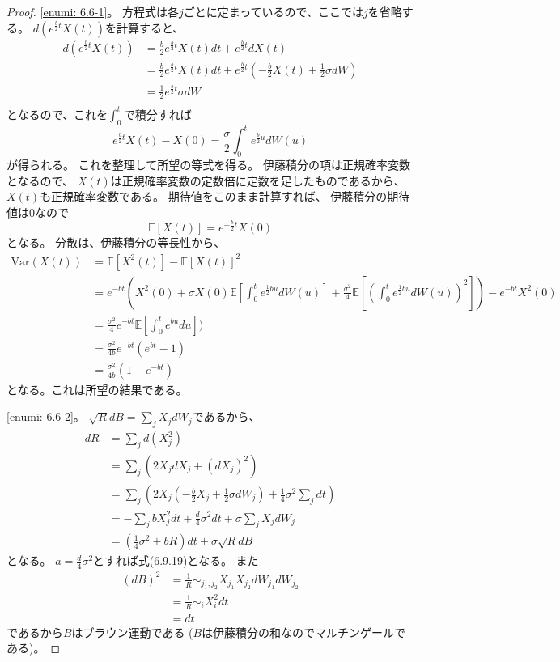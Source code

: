 \documentclass[uplatex]{jsarticle}
\theoremstyle{definition}
\def\E{\mathbb{E}}
\newcommand{\Var}{\mathrm{Var}}
\begin{document}
\begin{proof}
  \ref{enumi: 6.6-1}。
  方程式は各\(j\)ごとに定まっているので、ここでは\(j\)を省略する。
  \(d(e^{\frac{b}{2}t}X(t))\)を計算すると、
  \begin{align*}
    d(e^{\frac{b}{2}t}X(t))
    &= \frac{b}{2}e^{\frac{b}{2}t}X(t)dt + e^{\frac{b}{2}t}dX(t) \\
    &= \frac{b}{2}e^{\frac{b}{2}t}X(t)dt
    + e^{\frac{b}{2}t}\left( -\frac{b}{2}X(t)
    + \frac{1}{2}\sigma dW\right) \\
    &= \frac{1}{2}e^{\frac{b}{2}t}\sigma dW \\
  \end{align*}
  となるので、これを\(\int_0^t\)で積分すれば
  \[
  e^{\frac{b}{2}t}X(t) - X(0)
  = \frac{\sigma}{2}\int_0^te^{\frac{b}{2}u}dW(u)
  \]
  が得られる。
  これを整理して所望の等式を得る。
  伊藤積分の項は正規確率変数となるので、
  \(X(t)\)は正規確率変数の定数倍に定数を足したものであるから、
  \(X(t)\)も正規確率変数である。
  期待値をこのまま計算すれば、
  伊藤積分の期待値は\(0\)なので
  \[
  \E[X(t)] = e^{-\frac{b}{2}t}X(0)
  \]
  となる。
  分散は、伊藤積分の等長性から、
  \begin{align*}
    \Var(X(t))
    &= \E[X^2(t)] - \E[X(t)]^2 \\
    &= e^{-bt}\left(X^2(0)
    + \sigma X(0)\E\left[ \int_0^te^{\frac{1}{2}bu}dW(u)\right]
    + \frac{\sigma^2}{4}\E\left[
    \left(\int_0^te^{\frac{1}{2}bu}dW(u)\right)^2 \right]
    \right) - e^{-bt}X^2(0) \\
    &= \frac{\sigma^2}{4}e^{-bt}\E\left[ \int_0^te^{bu}du \right]) \\
    &= \frac{\sigma^2}{4b}e^{-bt}(e^{bt}-1) \\
    &= \frac{\sigma^2}{4b}(1-e^{-bt})
  \end{align*}
  となる。これは所望の結果である。

  \ref{enumi: 6.6-2}。
  \(\sqrt{R}dB = \sum_j X_j dW_j\)であるから、
  \begin{align*}
    dR &= \sum_j d(X_j^2) \\
    &= \sum_j \left( 2X_jdX_j + (dX_j)^2 \right) \\
    &= \sum_j \left( 2X_j\left(
    - \frac{b}{2}X_j + \frac{1}{2}\sigma dW_j\right)
    + \frac{1}{4}\sigma^2\sum_j dt \right) \\
    &= - \sum_j bX_j^2dt + \frac{d}{4}\sigma^2dt
    + \sigma \sum_j X_jdW_j \\
    &= \left( \frac{1}{4}\sigma^2 + bR\right) dt + \sigma \sqrt{R}dB
  \end{align*}
  となる。
  \(a = \frac{d}{4}\sigma^2\)とすれば式(6.9.19)となる。
  また
  \begin{align*}
    (dB)^2
    &= \frac{1}{R}\sim_{j_1,j_2} X_{j_1}X_{j_2}dW_{j_1}dW_{j_2} \\
    &= \frac{1}{R}\sim_i X_i^2dt \\
    &= dt
  \end{align*}
  であるから\(B\)はブラウン運動である
  (\(B\)は伊藤積分の和なのでマルチンゲールである)。


\end{proof}
\end{document}
